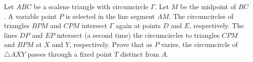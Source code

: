 Let $ABC$ be a scalene triangle with circumcircle $\Gamma$. Let $M$ be the midpoint of $BC$. A variable point $P$ is selected in the line segment $AM$. The circumcircles of triangles $BPM$ and $CPM$ intersect $\Gamma$ again at points $D$ and $E$,  respectively. The lines $DP$ and $EP$ intersect (a second time) the circumcircles to triangles $CPM$ and $BPM$ at $X$ and $Y$,  respectively. Prove that as $P$ varies, the circumcircle of $\triangle AXY$ passes through a fixed point $T$ distinct from $A$.